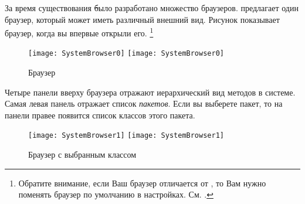 \documentclass[a4paper,10pt,twoside]{book}
\begin{document}
За время существования \st было разработано множество браузеров.
\pharo предлагает один браузер, который может иметь различный внешний вид.
Рисунок  показывает браузер, когда вы впервые открыли его. \footnote{Обратите внимание, если Ваш браузер отличается от  , то Вам нужно поменять браузер по умолчанию в настройках.  См. .}

\begin{figure}[htbp]
   \centering
   \ifluluelse
	 {\texttt{[image: SystemBrowser0]} }
	 {\texttt{[image: SystemBrowser0]} }
   \caption{Браузер}
\end{figure}


Четыре панели вверху браузера отражают иерархический вид методов в системе.
Самая левая панель отражает список \emph{пакетов}. Если вы выберете пакет, то на панели правее появится список классов этого пакета. 

\begin{figure}[htbp]
   \centering
   \ifluluelse
	   {\texttt{[image: SystemBrowser1]} }
	   {\texttt{[image: SystemBrowser1]} }
   \caption{Браузер с выбранным классом 
   }
\end{figure}

\end{document}
